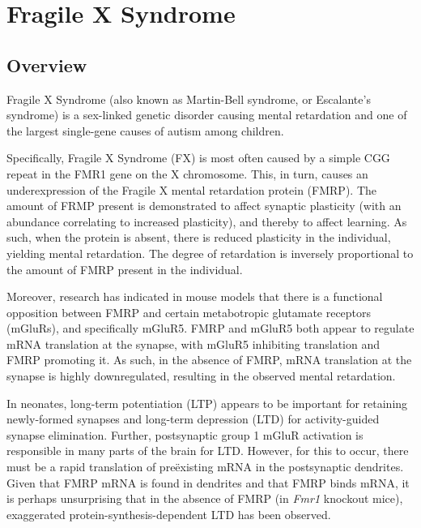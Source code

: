 

\section{Fragile X Syndrome}

\subsection{Overview}
Fragile X Syndrome (also known as Martin-Bell syndrome, or Escalante's syndrome) is a sex-linked genetic disorder causing mental retardation and one of the largest single-gene causes of autism among children.

Specifically, Fragile X Syndrome (FX) is most often caused by a simple CGG repeat in the FMR1 gene on the X chromosome. This, in turn, causes an underexpression of the Fragile X mental retardation protein (FMRP). The amount of FRMP present is demonstrated to affect synaptic plasticity (with an abundance correlating to increased plasticity), and thereby to affect learning. As such, when the protein is absent, there is reduced plasticity in the individual, yielding mental retardation. The degree of retardation is inversely proportional to the amount of FMRP present in the individual.

Moreover, research has indicated in mouse models that there is a functional opposition between FMRP and certain metabotropic glutamate receptors (mGluRs), and specifically mGluR5. FMRP and mGluR5 both appear to regulate mRNA translation at the synapse, with mGluR5 inhibiting translation and FMRP promoting it. As such, in the absence of FMRP, mRNA translation at the synapse is highly downregulated, resulting in the observed mental retardation.

In neonates, long-term potentiation (LTP) appears to be important for retaining newly-formed synapses and long-term depression (LTD) for activity-guided synapse elimination. Further, postsynaptic group 1 mGluR activation is responsible in many parts of the brain for LTD. However, for this to occur, there must be a rapid translation of pre\"{e}xisting mRNA in the postsynaptic dendrites. Given that FMRP mRNA is found in dendrites and that FMRP binds mRNA, it is perhaps unsurprising that in the absence of FMRP (in \textit{Fmr1} knockout mice), exaggerated protein-synthesis-dependent LTD has been observed. 

